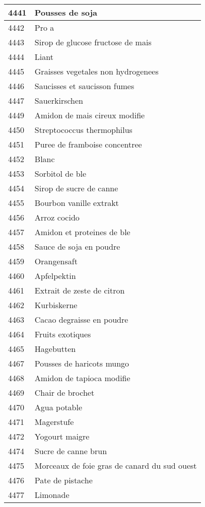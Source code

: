 \begin{longtable}{|l|l|}
4441 & Pousses de soja \\ \hline 
4442 & Pro a \\ \hline 
4443 & Sirop de glucose fructose de mais \\ \hline 
4444 & Liant \\ \hline 
4445 & Graisses vegetales non hydrogenees \\ \hline 
4446 & Saucisses et saucisson fumes \\ \hline 
4447 & Sauerkirschen \\ \hline 
4449 & Amidon de mais cireux modifie \\ \hline 
4450 & Streptococcus thermophilus \\ \hline 
4451 & Puree de framboise concentree \\ \hline 
4452 & Blanc \\ \hline 
4453 & Sorbitol de ble \\ \hline 
4454 & Sirop de sucre de canne \\ \hline 
4455 & Bourbon vanille extrakt \\ \hline 
4456 & Arroz cocido \\ \hline 
4457 & Amidon et proteines de ble \\ \hline 
4458 & Sauce de soja en poudre \\ \hline 
4459 & Orangensaft \\ \hline 
4460 & Apfelpektin \\ \hline 
4461 & Extrait de zeste de citron \\ \hline 
4462 & Kurbiskerne \\ \hline 
4463 & Cacao degraisse en poudre \\ \hline 
4464 & Fruits exotiques \\ \hline 
4465 & Hagebutten \\ \hline 
4467 & Pousses de haricots mungo \\ \hline 
4468 & Amidon de tapioca modifie \\ \hline 
4469 & Chair de brochet \\ \hline 
4470 & Agua potable \\ \hline 
4471 & Magerstufe \\ \hline 
4472 & Yogourt maigre \\ \hline 
4474 & Sucre de canne brun \\ \hline 
4475 & Morceaux de foie gras de canard du sud ouest \\ \hline 
4476 & Pate de pistache \\ \hline 
4477 & Limonade \\ \hline 

\end{longtable}
